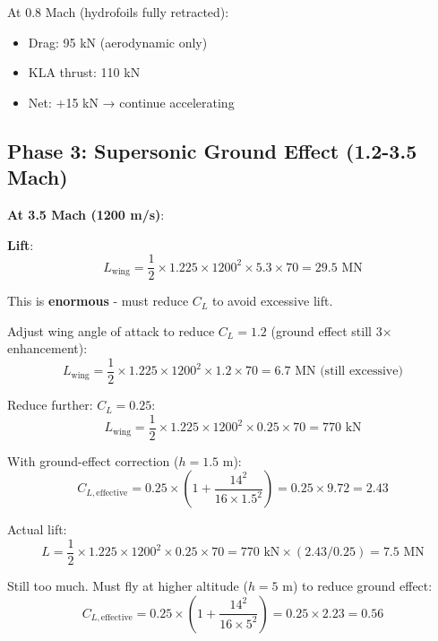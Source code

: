 \documentclass[12pt,a4paper]{article}
\begin{document}
At 0.8 Mach (hydrofoils fully retracted):
\begin{itemize}
\item Drag: 95 kN (aerodynamic only)
\item KLA thrust: 110 kN
\item Net: +15 kN → continue accelerating
\end{itemize}

\subsection{Phase 3: Supersonic Ground Effect (1.2-3.5 Mach)}

\textbf{At 3.5 Mach (1200 m/s)}:

\textbf{Lift}:
\begin{equation}
L_{\text{wing}} = \frac{1}{2} \times 1.225 \times 1200^2 \times 5.3 \times 70 = 29.5 \text{ MN}
\end{equation}

This is \textbf{enormous} - must reduce $C_L$ to avoid excessive lift.

Adjust wing angle of attack to reduce $C_L = 1.2$ (ground effect still 3× enhancement):
\begin{equation}
L_{\text{wing}} = \frac{1}{2} \times 1.225 \times 1200^2 \times 1.2 \times 70 = 6.7 \text{ MN} \text{ (still excessive)}
\end{equation}

Reduce further: $C_L = 0.25$:
\begin{equation}
L_{\text{wing}} = \frac{1}{2} \times 1.225 \times 1200^2 \times 0.25 \times 70 = 770 \text{ kN}
\end{equation}

With ground-effect correction ($h = 1.5$ m):
\begin{equation}
C_{L,\text{effective}} = 0.25 \times \left(1 + \frac{14^2}{16 \times 1.5^2}\right) = 0.25 \times 9.72 = 2.43
\end{equation}

Actual lift:
\begin{equation}
L = \frac{1}{2} \times 1.225 \times 1200^2 \times 0.25 \times 70 = 770 \text{ kN} \times (2.43/0.25) = 7.5 \text{ MN}
\end{equation}

Still too much. Must fly at higher altitude ($h = 5$ m) to reduce ground effect:
\begin{equation}
C_{L,\text{effective}} = 0.25 \times \left(1 + \frac{14^2}{16 \times 5^2}\right) = 0.25 \times 2.23 = 0.56
\end{equation}
\end{document}
